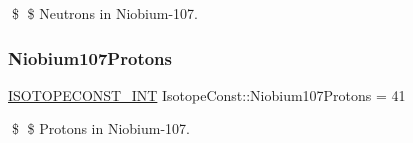 \$ \$ Neutrons in Niobium-\/107. \mbox{\label{group___isotope_const-_niobium-_nb107_gafc8b5bc8454e812991838cf6a09e420b}} 
\subsubsection{\texorpdfstring{Niobium107\+Protons}{Niobium107Protons}}
{\footnotesize\ttfamily \mbox{\hyperlink{group___isotope_const-_macros_ga5f18360b3e99483a35c32d789e62621c}{I\+S\+O\+T\+O\+P\+E\+C\+O\+N\+S\+T\+\_\+\+I\+NT}} Isotope\+Const\+::\+Niobium107\+Protons = 41}

\$ \$ Protons in Niobium-\/107. 